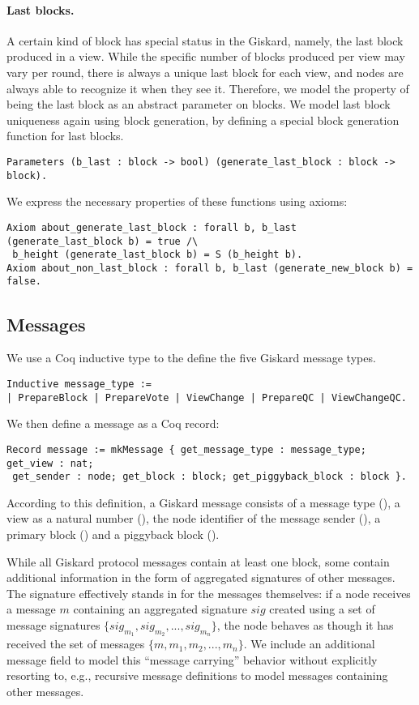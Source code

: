 \documentclass{easychair}
\begin{document}
\paragraph{Last blocks.}
%
A certain kind of block has special status in the Giskard, namely, the last block produced in a view. While the specific number of blocks produced per view may vary per round, there is always a unique last block for each view, and nodes are always able to recognize it when they see it. Therefore, we model the property of being the last block as an abstract parameter on blocks. We model last block uniqueness again using block generation, by defining a special block generation function for last blocks. 
\begin{lstlisting}[language=Coq] 
Parameters (b_last : block -> bool) (generate_last_block : block -> block). 
\end{lstlisting} 
We express the necessary properties of these functions using axioms:
\begin{lstlisting}[language=Coq]
Axiom about_generate_last_block : forall b, b_last (generate_last_block b) = true /\
 b_height (generate_last_block b) = S (b_height b).
Axiom about_non_last_block : forall b, b_last (generate_new_block b) = false.
\end{lstlisting} 

\subsection{Messages}
We use a Coq inductive type to the define the five Giskard message types.
\begin{lstlisting}[language=Coq]
Inductive message_type := 
| PrepareBlock | PrepareVote | ViewChange | PrepareQC | ViewChangeQC.
\end{lstlisting}
We then define a message as a Coq record:
\begin{lstlisting}[language=Coq]
Record message := mkMessage { get_message_type : message_type;  get_view : nat;
 get_sender : node; get_block : block; get_piggyback_block : block }.
\end{lstlisting}
According to this definition, a Giskard message consists of a message type (), a view as a natural number (), the node identifier of the message sender (), a primary block () and a piggyback block ().

While all Giskard protocol messages contain at least one block, some contain additional information in the form of aggregated signatures of other messages. The signature effectively stands in for the messages themselves: if a node receives a message $m$ containing an aggregated signature $sig$ created using a set of message signatures $\{sig_{m_1}, sig_{m_2}, ..., sig_{m_n}\}$, the node behaves as though it has received the set of messages $\{m, m_1, m_2, ..., m_n\}$. We include an additional message field to model this ``message carrying'' behavior without explicitly resorting to, e.g., recursive message definitions to model messages containing other messages.
\end{document}

